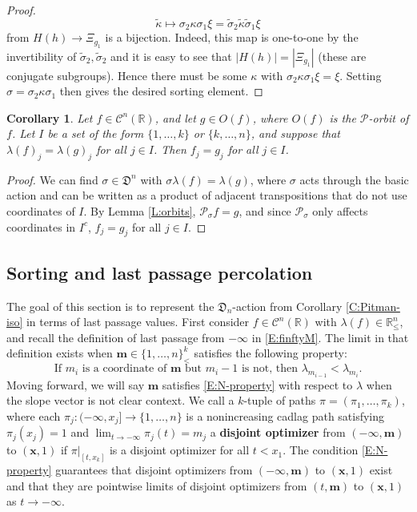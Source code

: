 \documentclass[11pt]{article}
\newcommand{\R}{\mathbb{R}}
\newcommand{\ka}{\kappa}
\newcommand{\sig}{\sigma}
\newcommand{\la}{\lambda}
\newcommand{\cC}{\mathcal{C}}
\newcommand{\cP}{\mathcal{P}}
\newcommand{\bx}{\mathbf{x}}
\newcommand{\bm}{\mathbf{m}}
\newtheorem{corollary}[theorem]{Corollary}
\theoremstyle{definition} %
\theoremstyle{remark} %
\begin{document}
\begin{proof}
$$
\tilde \kappa \mapsto \sig_2 \ka \sig_1 \xi = \tilde \sig_2 \tilde \ka \tilde \sig_1 \xi
$$
from $H(h) \to \Xi_{g_1}$ is a bijection. Indeed, this map is one-to-one by the invertibility of $\tilde \sig_2, \tilde \sig_2$ and it is easy to see that $|H(h)| = |\Xi_{g_1}|$ (these are conjugate subgroups). Hence there must be some $\ka$ with $\sig_2 \ka \sig_1 \xi = \xi$. Setting $\sig = \sig_2 \ka \sig_1$ then gives the desired sorting element.
\end{proof}

\begin{corollary}\label{C:samestart} Let $f \in \cC^n(\R)$, and let $g \in O(f)$, where $O(f)$ is the $\cP$-orbit of $f$. Let $I$ be a set of the form $\{1,\ldots,k\}$ or $\{k,\ldots,n\}$, and suppose that
	$
	\la(f)_j = \la(g)_j
	$ for all $j \in I$. Then $f_j=g_j$ for all $j\in I$.
\end{corollary}
\begin{proof}
We can find $\sig \in \mathfrak{D}^n$ with $\sig \la(f) = \la(g)$, where $\sig$ acts through the basic action and can be written as a product of adjacent transpositions that do not use coordinates of $I$. By Lemma \ref{L:orbits}, $\cP_\sig f = g$, and since $\cP_\sig$ only affects coordinates in $I^c$, $f_j=g_j$ for all $j\in I$.
\end{proof}

\subsection{Sorting and last passage percolation}
The goal of this section is to represent the $\mathfrak{D}_n$-action from Corollary \ref{C:Pitman-iso} in terms of last passage values.  First consider $f \in \cC^n(\R)$ with $\la(f) \in \R^n_\le$, and recall the definition of last passage from $-\infty$ in \eqref{E:finftyM}. The limit in that definition exists when $\bm \in \{1, \dots, n\}^k_<$ satisfies the following property:
\begin{equation}
\label{E:N-property}
\text{If $m_i$ is a coordinate of $\bm$ but $m_i - 1$ is not, then $\la_{m_{i-1}} < \la_{m_i}$}.
\end{equation} 
Moving forward, we will say $\bm$ satisfies \eqref{E:N-property} with respect to $\la$ when the slope vector is not clear context. We call a $k$-tuple of paths $\pi = (\pi_1, \dots, \pi_k)$, where each $\pi_j:(-\infty, x_j] \to \{1, \dots, n\}$ is a nonincreasing cadlag path satisfying $\pi_j(x_j) = 1$ and $\lim_{t \to -\infty} \pi_j(t) = m_j$ a \textbf{disjoint optimizer} from $(-\infty, \bm)$ to $(\bx, 1)$ if $\pi|_{[t, x_k]}$ is a disjoint optimizer for all $t < x_1$. The condition \eqref{E:N-property} guarantees that disjoint optimizers from $(-\infty, \bm)$ to $(\bx, 1)$ exist and that they are pointwise limits of disjoint optimizers from $(t, \bm)$ to $(\bx, 1)$ as $t \to -\infty$.
\end{document}
